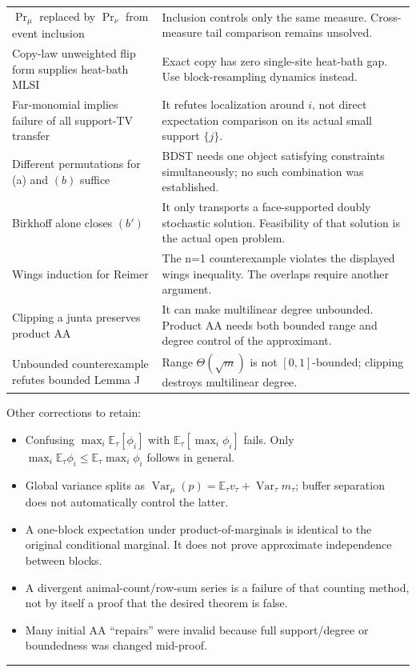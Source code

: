 {\begin{longtable}[]{@{}
  >{\raggedright\arraybackslash}p{}
  >{\raggedright\arraybackslash}p{}@{}}
\(\Pr_\mu\) replaced by \(\Pr_\nu\) from event inclusion & Inclusion controls only the same measure. Cross-measure tail comparison remains unsolved. \\
Copy-law unweighted flip form supplies heat-bath MLSI & Exact copy has zero single-site heat-bath gap. Use block-resampling dynamics instead. \\
Far-monomial implies failure of all support-TV transfer & It refutes localization around \(i\), not direct expectation comparison on its actual small support \(\{j\}\). \\
Different permutations for (a) and \((b)\) suffice & BDST needs one object satisfying constraints simultaneously; no such combination was established. \\
Birkhoff alone closes \((b')\) & It only transports a face-supported doubly stochastic solution. Feasibility of that solution is the actual open problem. \\
Wings induction for Reimer & The n=1 counterexample violates the displayed wings inequality. The overlaps require another argument. \\
Clipping a junta preserves product AA & It can make multilinear degree unbounded. Product AA needs both bounded range and degree control of the approximant. \\
Unbounded counterexample refutes bounded Lemma J & Range \(\Theta(\sqrt m)\) is not \([0,1]\)-bounded; clipping destroys multilinear degree. \\
\end{longtable}
}

Other corrections to retain:

\begin{itemize}
\tightlist
\item
  Confusing \(\max_i\mathbb E_\tau[\phi_i]\) with \(\mathbb E_\tau[\max_i\phi_i]\) fails. Only \(\max_i\mathbb E_\tau\phi_i\le\mathbb E_\tau\max_i\phi_i\) follows in general.
\item
  Global variance splits as \(\operatorname{Var}_\mu(p)=\mathbb E_\tau v_\tau+\operatorname{Var}_\tau m_\tau\); buffer separation does not automatically control the latter.
\item
  A one-block expectation under product-of-marginals is identical to the original conditional marginal. It does not prove approximate independence between blocks.
\item
  A divergent animal-count/row-sum series is a failure of that counting method, not by itself a proof that the desired theorem is false.
\item
  Many initial AA ``repairs'' were invalid because full support/degree or boundedness was changed mid-proof.
\end{itemize}

\begin{center}\rule{0.5\linewidth}{0.5pt}\end{center}
